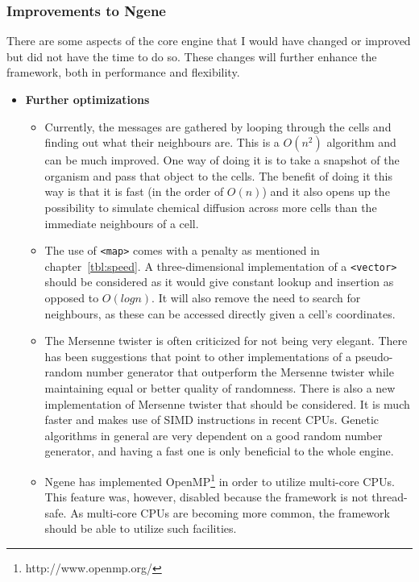 \subsubsection{Improvements to Ngene}
\label{sec:improvements}
There are some aspects of the core engine that I would have changed or improved but did not have the time to do so. These changes will further enhance the framework, both in performance and flexibility.

\begin{itemize}
	\item\textbf{Further optimizations}
		\begin{itemize}
			\item Currently, the messages are gathered by looping through the cells and finding out what their neighbours are. This is a $O(n^{2})$ algorithm and can be much improved. One way of doing it is to take a snapshot of the organism and pass that object to the cells. The benefit of doing it this way is that it is fast (in the order of $O(n)$) and it also opens up the possibility to simulate chemical diffusion across more cells than the immediate neighbours of a cell.

			\item The use of \texttt{<map>} comes with a penalty as mentioned in chapter~\ref{tbl:speed}. A three-dimensional implementation of a \texttt{<vector>} should be considered as it would give constant lookup and insertion as opposed to $O(log n)$. It will also remove the need to search for neighbours, as these can be accessed directly given a cell's coordinates.

			\item The Mersenne twister is often criticized for not being very elegant. There has been suggestions that point to other implementations of a pseudo-random number generator that outperform the Mersenne twister while maintaining equal or better quality of randomness. There is also a new implementation of Mersenne twister that should be considered. It is much faster and makes use of SIMD instructions in recent CPUs. Genetic algorithms in general are very dependent on a good random number generator, and having a fast one is only beneficial to the whole engine.

			\item Ngene has implemented OpenMP\footnote{http://www.openmp.org/} in order to utilize multi-core CPUs. This feature was, however, disabled because the framework is not thread-safe. As multi-core CPUs are becoming more common, the framework should be able to utilize such facilities.
		\end{itemize}


\end{itemize}
